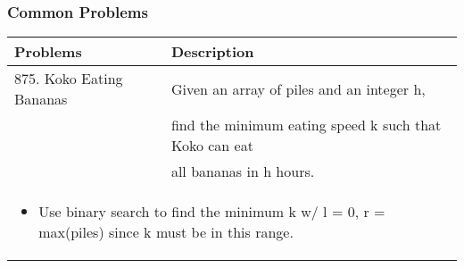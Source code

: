 \subsubsection{Common Problems}
\begin{summary}
    \begin{center}
        \begin{tabular}{ll}
            \toprule
            \textbf{Problems} & \textbf{Description} \\
            \midrule
            \midrule
            875. Koko Eating Bananas & Given an array of piles and an integer h, \\
            & find the minimum eating speed k such that Koko can eat \\
            & all bananas in h hours. \\
            \multicolumn{2}{p{\linewidth}}{
                \begin{itemize}
                    \item Use binary search to find the minimum k w/ l = 0, r = max(piles) since k must be in this range.

\end{itemize}}
\end{tabular}
\end{center}
\end{summary}
